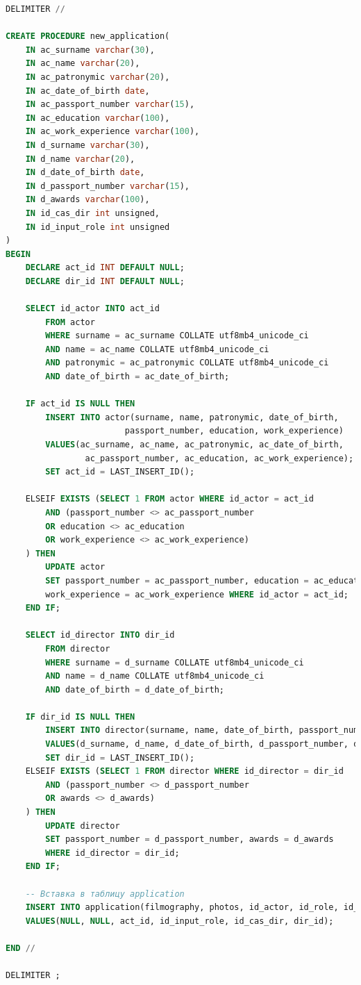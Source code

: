 \documentclass[11pt,a4paper,final]{article} %
\begin{document}
\begin{lstlisting}[caption={Код создания процедуры new\_application}, label=lst:l13, language=sql]
DELIMITER // 

CREATE PROCEDURE new_application(
	IN ac_surname varchar(30),
	IN ac_name varchar(20), 
	IN ac_patronymic varchar(20),    
	IN ac_date_of_birth date, 
	IN ac_passport_number varchar(15),
	IN ac_education varchar(100),
	IN ac_work_experience varchar(100),
	IN d_surname varchar(30),
	IN d_name varchar(20), 
	IN d_date_of_birth date, 
	IN d_passport_number varchar(15),
	IN d_awards varchar(100),
	IN id_cas_dir int unsigned,
	IN id_input_role int unsigned
)
BEGIN
	DECLARE act_id INT DEFAULT NULL;
	DECLARE dir_id INT DEFAULT NULL;
	
	SELECT id_actor INTO act_id
		FROM actor
		WHERE surname = ac_surname COLLATE utf8mb4_unicode_ci
		AND name = ac_name COLLATE utf8mb4_unicode_ci
		AND patronymic = ac_patronymic COLLATE utf8mb4_unicode_ci
		AND date_of_birth = ac_date_of_birth;
	
	IF act_id IS NULL THEN
		INSERT INTO actor(surname, name, patronymic, date_of_birth, 
						passport_number, education, work_experience)
		VALUES(ac_surname, ac_name, ac_patronymic, ac_date_of_birth,
				ac_passport_number, ac_education, ac_work_experience);
		SET act_id = LAST_INSERT_ID();
	
	ELSEIF EXISTS (SELECT 1 FROM actor WHERE id_actor = act_id
		AND (passport_number <> ac_passport_number
		OR education <> ac_education
		OR work_experience <> ac_work_experience)
	) THEN
		UPDATE actor
		SET passport_number = ac_passport_number, education = ac_education, 
		work_experience = ac_work_experience WHERE id_actor = act_id;
	END IF;
	
	SELECT id_director INTO dir_id
		FROM director
		WHERE surname = d_surname COLLATE utf8mb4_unicode_ci
		AND name = d_name COLLATE utf8mb4_unicode_ci
		AND date_of_birth = d_date_of_birth;
	
	IF dir_id IS NULL THEN
		INSERT INTO director(surname, name, date_of_birth, passport_number, awards)
		VALUES(d_surname, d_name, d_date_of_birth, d_passport_number, d_awards);
		SET dir_id = LAST_INSERT_ID();
	ELSEIF EXISTS (SELECT 1 FROM director WHERE id_director = dir_id
		AND (passport_number <> d_passport_number
		OR awards <> d_awards)
	) THEN
		UPDATE director
		SET passport_number = d_passport_number, awards = d_awards 
		WHERE id_director = dir_id;
	END IF;
	
	-- Вставка в таблицу application
	INSERT INTO application(filmography, photos, id_actor, id_role, id_casting_director, id_director)
	VALUES(NULL, NULL, act_id, id_input_role, id_cas_dir, dir_id);

END //

DELIMITER ;
\end{lstlisting}
\end{document}
